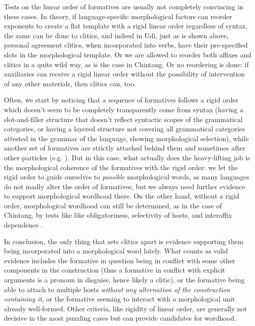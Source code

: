 \documentclass[a4paper, oneside, scheme=plain, 12pt]{article}
\newcommand*{\citesec}[1]{\S~{#1}}
\begin{document}
Tests on the linear order of formatives are usually not completely convincing in these cases.
In theory, if language-specific morphological factors can reorder exponents
to create a flat template with a rigid linear order regardless of syntax,
the same can be done to clitics,
and indeed in Udi, just as is shown above, personal agreement clitics,
when incorporated into verbs, have their pre-specified slots in the morphological template. 
Or we are allowed to reorder both affixes and clitics in a quite wild way,
as is the case in Chintang.
Or no reordering is done: if auxiliaries can receive a rigid linear order without the possibility of intervention of any other materials, then clitics can, too. 

Often, we start by noticing that a sequence of formatives follows a rigid order
which doesn't seem to be completely transparently come from syntax
(having a slot-and-filler structure that doesn't reflect syntactic scopes of the grammatical categories, or having a layered structure not covering all grammatical categories attested in the grammar of the language, showing morphological selection),
while another set of formatives are strictly attached behind them and sometimes after other particles
(e.g. \citealt[\citesec{11.6.2}]{jacques2021grammar}).
But in this case, what actually does the heavy-lifting job
is the morphological coherence of the formatives with the rigid order:
we let the rigid order to guide ourselves to \emph{possible} morphological words,
as many languages do not madly alter the order of formatives,
but we always need further evidence to support morphological wordhood there.
On the other hand, without a rigid order,
morphological wordhood can still be determined,
as in the case of Chintang, by tests like like obligatoriness, selectivity of hosts, and interaffix dependence \citep{bickel2007free}.

In conclusion, the only thing that sets clitics apart is evidence supporting
them being incorporated into a morphological word lately.
What counts as valid evidence includes 
the formative in question being in conflict with some other components in the construction
(thus a formative in conflict with explicit arguments is a pronoun in disguise,
hence likely a clitic),
or the formative being able to attach to multiple hosts
\emph{without any alternation of the construction containing it},
or the formative seeming to interact with a morphological unit already well-formed.
Other criteria, like rigidity of linear order,
are generally not decisive in the most puzzling cases
but can provide candidates for wordhood.
\end{document}
